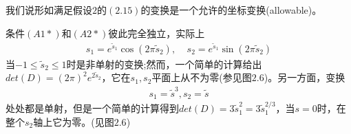 我们说形如满足假设$2$的$(2.15)$的变换是一个允许的坐标变换(allowable)。

条件$(A1*)$和$(A2*)$彼此完全独立，实际上
\begin{gather}
s_1=e^{\tilde{s}_1}\cos (2\pi \tilde{s}_2),~~~~~s_2=e^{\tilde{s}_1}\sin (2\pi \tilde{s}_2)
\end{gather}
当$-1 \leq \tilde{s}_2 \leq 1$时是非单射的变换;然而，一个简单的计算给出$det(D) = (2\pi)^2e^{2\tilde{s}_2}$，它在$s_1,s_2$平面上从不为零(参见图$2.6$)。另一方面，变换
\begin{gather}
s_1=\tilde{s}^3 ,s_2=\tilde{s}
\end{gather}
处处都是单射，但是一个简单的计算得到$det(D)=3\tilde{s}_1^2=3\tilde{s}_1^{2/3}$，当$s=0$时，在整个$s_2$轴上它为零。(见图$2.6$)

